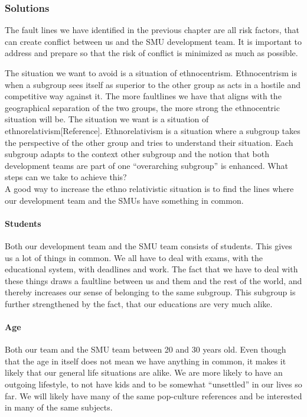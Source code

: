 \documentclass[a4paper,11pt,report]{article}
\begin{document}
\subsubsection{Solutions}
The fault lines we have identified in the previous chapter are all risk factors, that can create conflict between us and the SMU development team. It is important to address and prepare so that the risk of conflict is minimized as much as possible.

The situation we want to avoid is a situation of ethnocentrism. Ethnocentrism is when a subgroup sees itself as superior to the other group as acts in a hostile and competitive way against it. The more faultlines we have that aligns with the geographical separation of the two groups, the more strong the ethnocentric situation will be. The situation we want is a situation of ethnorelativism[Reference]. Ethnorelativism is a situation where a subgroup takes the perspective of the other group and tries to understand their situation. Each subgroup adapts to the context other subgroup and the notion that both development teams are part of one “overarching subgroup” is enhanced. What steps can we take to achieve this?\\

A good way to increase the ethno relativistic situation is to find the lines where our development team and the SMUs have something in common. \\

\paragraph{Students}
Both our development team and the SMU team consists of students. This gives us a lot of things in common. We all have to deal with exams, with the educational system, with deadlines and work. The fact that we have to deal with these things draws a faultline between us and them and the rest of the world, and thereby increases our sense of belonging to the same subgroup. This subgroup is further strengthened by the fact, that our educations are very much alike. \\

\paragraph{Age}
Both our team and the SMU team between 20 and 30 years old. Even though that the age in itself does not mean we have anything in common, it makes it likely that our general life situations are alike. We are more likely to have an outgoing lifestyle, to not have kids and to be somewhat “unsettled” in our lives so far. We will likely have many of the same pop-culture references and be interested in many of the same subjects. 
\end{document}
